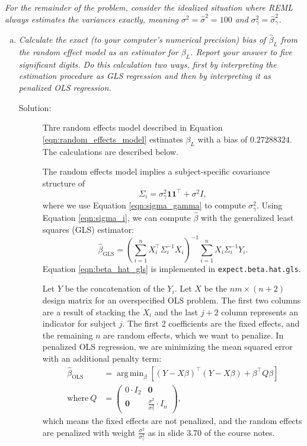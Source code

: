 \documentclass[11pt, letterpaper]{article}
\DeclareMathOperator*{\argmin}{arg\,min}
\begin{document}
{\em For the remainder of the problem, consider the idealized situation where REML always estimates the variances
exactly, meaning $\sigma^2=\hat{\sigma}^2=100$ and $\sigma^2_\gamma=\hat{\sigma}^2_\gamma$.}
\begin{enumerate}[(a)]
\addtocounter{enumi}{6}
\item {\em Calculate the exact (to your computer's numerical precision) bias of $\hat{\beta}_L$ from the random effect model as an estimator for $\beta_L$.  Report your answer to five significant digits.  Do this calculation two ways, first by interpreting the estimation procedure as GLS regression and then by interpreting it as penalized OLS regression.}

\begin{description}
\item[Solution:] Thre random effects model described in Equation
  \ref{eqn:random_effects_model} estimates $\beta_L$ with a bias of
  $\boxed{0.27288324.}$ The calculations are described below.

  The random effects model implies a subject-specific covariance structure of
  \begin{equation}
    \Sigma_i = \sigma^2_\gamma\mathbf{1}\mathbf{1}^\intercal + \sigma^2I,
    \label{eqn:sigma_i}
  \end{equation}
  where we use Equation \ref{eqn:sigma_gamma} to compute
  $\sigma_\gamma^2$. Using Equation \ref{eqn:sigma_i}, we can compute
  $\hat{\beta}$ with the generalized least squares (GLS) estimator:
  \begin{equation}
    \hat{\beta}_{\text{GLS}} = \left(\sum_{i=1}^nX_i^\intercal \Sigma_i^{-1}X_i\right)^{-1}
    \sum_{i=1}^n X_i\Sigma_i^{-1}Y_i.
    \label{eqn:beta_hat_gls}
  \end{equation}
  Equation \ref{eqn:beta_hat_gls} is implemented in
  \texttt{expect.beta.hat.gls}.

  Let $Y$ be the concatenation of the $Y_i$. Let $X$ be the $nm \times (n + 2)$
  design matrix for an overspecified OLS problem. The first two columns are a
  result of stacking the $X_i$ and the last $j + 2$ column represents an
  indicator for subject $j$. The first 2 coefficients are the fixed effects, and
  the remaining $n$ are random effects, which we want to penalize. In penalized
  OLS regression, we are minimizing the mean squared error with an additional
  penalty term:
  \begin{align}
    \hat{\beta}_{\text{OLS}}
    &= \argmin_{\beta}\left[
      \left(Y - X\beta\right)^\intercal\left(Y - X\beta\right)
      +
      \beta^\intercal Q\beta
      \right] \label{eqn:penalized_ols_objective}\\
    \text{where}~
    Q &= \begin{pmatrix}
      0 \cdot I_2 & \mathbf{0} \\
      \mathbf{0} & \frac{\sigma^2}{\sigma_\gamma^2} \cdot I_n
    \end{pmatrix}, \nonumber
  \end{align}
  which means the fixed effects are not penalized, and the random effects are
  penalized with weight $\frac{\sigma^2}{\sigma_\gamma^2}$ as in slide 3.70 of
  the course notes.


\end{description}
\end{enumerate}
\end{document}
